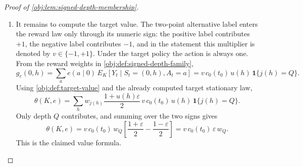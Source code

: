 \begin{proof}[Proof of \cref{obj:lem:signed-depth-membership}]
\begin{enumerate}
\item It remains to compute the target value.  The two-point alternative label
enters the reward law only through its numeric sign: the positive label
contributes \(+1\), the negative label contributes \(-1\), and in the statement
this multiplier is denoted by \(v\in\{-1,+1\}\).  Under the target policy the
action is always one.  From the reward weights in
\cref{obj:def:signed-depth-family},
\[
g_e(0,h)
=
\sum_a e(a\mid0)\,E_K[Y_t\mid S_t=(0,h),A_t=a]
=
v\,c_0(t_0)\,u(h)\,\mathbf 1\{j(h)=Q\}.
\]
Using \cref{obj:def:target-value} and the already computed target stationary
law,
\[
\theta(K,e)
=
\sum_h
w_{j(h)}
\frac{1+u(h)\varepsilon}{2}\,
v\,c_0(t_0)\,u(h)\,\mathbf 1\{j(h)=Q\}.
\]
Only depth \(Q\) contributes, and summing over the two signs gives
\[
\theta(K,e)
=
v\,c_0(t_0)\,w_Q
\left[
\frac{1+\varepsilon}{2}
-
\frac{1-\varepsilon}{2}
\right]
=
v\,c_0(t_0)\,\varepsilon\,w_Q .
\]
This is the claimed value formula. %
\end{enumerate}
\end{proof}
